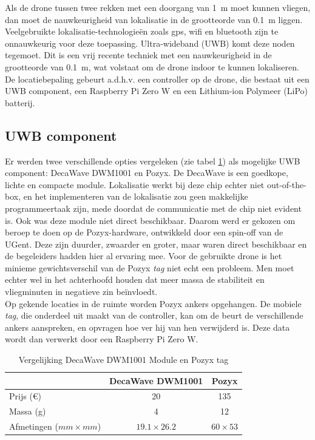 Als de drone tussen twee rekken met een doorgang van \SI{1}{\m} moet kunnen vliegen, dan moet de nauwkeurigheid van lokalisatie in de grootteorde van \SI{0.1}{\m} liggen.
Veelgebruikte lokalisatie-technologieën zoals gps, wifi en bluetooth zijn te onnauwkeurig voor deze toepassing.
Ultra-wideband (UWB) komt deze noden tegemoet.
Dit is een vrij recente techniek met een nauwkeurigheid in de grootteorde van \SI{0.1}{\m}, wat volstaat om de drone indoor te kunnen lokaliseren.
De locatiebepaling gebeurt a.d.h.v. een controller op de drone, die bestaat uit een UWB component, een Raspberry Pi Zero W en een Lithium-ion Polymeer (LiPo) batterij.\\

\subsection{UWB component} \label{sec:uwb}
Er werden twee verschillende opties vergeleken (zie tabel \ref{tab:decavspozyx}) als mogelijke UWB component: DecaWave DWM1001 en Pozyx.
De DecaWave is een goedkope, lichte en compacte module. Lokalisatie werkt bij deze chip echter niet out-of-the-box, en het implementeren van de lokalisatie zou geen makkelijke programmeertaak zijn, mede doordat de communicatie met de chip niet evident is.
Ook was deze module niet direct beschikbaar.
Daarom werd er gekozen om beroep te doen op de Pozyx-hardware, ontwikkeld door een spin-off van de UGent.
Deze zijn duurder, zwaarder en groter, maar waren direct beschikbaar en de begeleiders hadden hier al ervaring mee.
Voor de gebruikte drone is het minieme gewichtsverschil van de Pozyx \textit{tag} niet echt een probleem. Men moet echter wel in het achterhoofd houden dat meer massa de stabiliteit en vliegminuten in negatieve zin be\"invloedt.\\

Op gekende locaties in de ruimte worden Pozyx ankers opgehangen.
De mobiele \textit{tag}, die onderdeel uit maakt van de controller, kan om de beurt de verschillende ankers aanspreken, en opvragen hoe ver hij van hen verwijderd is.
Deze data wordt dan verwerkt door een Raspberry Pi Zero W.
\begin{table}[p]
	\centering
	\begin{tabular}{ | l | c | c | } \hline
		& DecaWave DWM1001 & Pozyx \\
		\hline 
		\hline
		Prijs (\euro{}) & 20 & 135 \\ 
		\hline
		Massa (g) & 4 & 12 \\ 
		\hline
		Afmetingen ($mm \times mm$) & $19.1 \times 26.2$ & $60 \times 53$ \\ 
		\hline
	\end{tabular}
	\caption[Vergelijking DecaWave DWM1001 Module en Pozyx tag]{Vergelijking DecaWave DWM1001 Module en Pozyx tag}
	\label{tab:decavspozyx}
\end{table}

